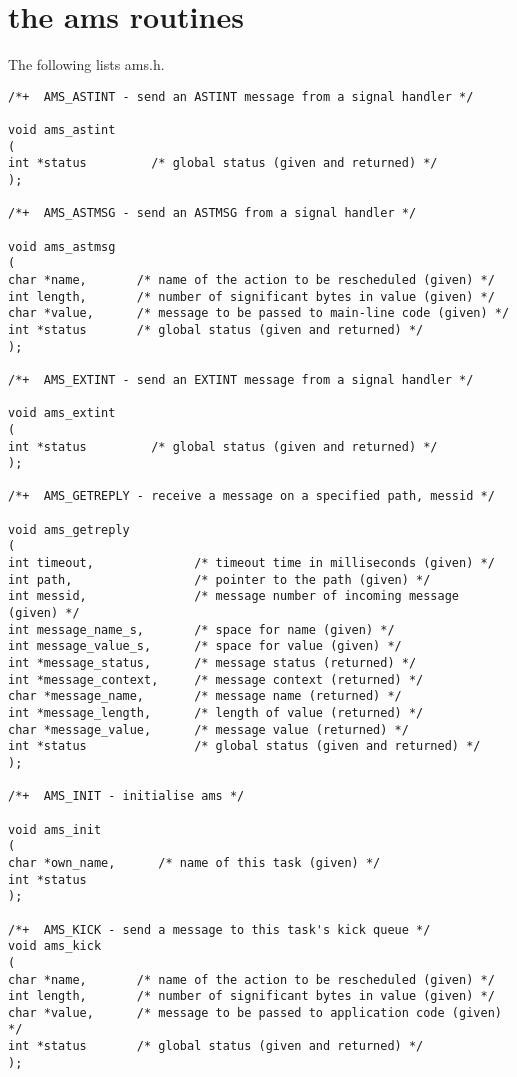 \section {the ams routines}

The following lists ams.h.


\begin{verbatim}
/*+  AMS_ASTINT - send an ASTINT message from a signal handler */

void ams_astint
(
int *status         /* global status (given and returned) */
);

/*+  AMS_ASTMSG - send an ASTMSG from a signal handler */

void ams_astmsg
(
char *name,       /* name of the action to be rescheduled (given) */
int length,       /* number of significant bytes in value (given) */
char *value,      /* message to be passed to main-line code (given) */
int *status       /* global status (given and returned) */
);

/*+  AMS_EXTINT - send an EXTINT message from a signal handler */

void ams_extint
(
int *status         /* global status (given and returned) */
);

/*+  AMS_GETREPLY - receive a message on a specified path, messid */

void ams_getreply
(
int timeout,              /* timeout time in milliseconds (given) */
int path,                 /* pointer to the path (given) */
int messid,               /* message number of incoming message (given) */
int message_name_s,       /* space for name (given) */
int message_value_s,      /* space for value (given) */
int *message_status,      /* message status (returned) */
int *message_context,     /* message context (returned) */
char *message_name,       /* message name (returned) */
int *message_length,      /* length of value (returned) */
char *message_value,      /* message value (returned) */
int *status               /* global status (given and returned) */
);

/*+  AMS_INIT - initialise ams */

void ams_init
(
char *own_name,      /* name of this task (given) */
int *status
);

/*+  AMS_KICK - send a message to this task's kick queue */
void ams_kick
(
char *name,       /* name of the action to be rescheduled (given) */
int length,       /* number of significant bytes in value (given) */
char *value,      /* message to be passed to application code (given) */
int *status       /* global status (given and returned) */
);


\end{verbatim}
